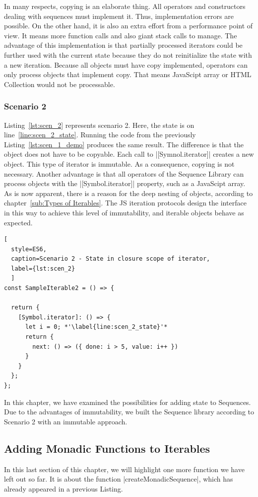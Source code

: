 In many respects, copying is an elaborate thing. All operators and constructors 
dealing with sequences must implement it. Thus, implementation errors are 
possible. On the other hand, it is also an extra effort from a performance point 
of view. It means more function calls and also giant stack calls to manage.
The advantage of this implementation is that partially processed iterators could 
be further used with the current state because they do not reinitialize the 
state with a new iteration.
Because all objects must have copy implemented, operators can 
only process objects that implement copy. That means JavaScipt array or HTML 
Collection would not be processable.

\subsubsection{Scenario 2}
Listing~\ref{lst:scen_2} represents scenario 2. Here, the state is on 
line~\ref{line:scen_2_state}. Running the code from the previously
Listing~\ref{lst:scen_1_demo} produces the same result. The difference is that 
the object does not have to be copyable. Each call to |[Symnol.iterator]| 
creates a new object. This type of iterator is immutable. As a consequence, 
copying is not necessary. Another advantage is that all operators of the 
Sequence Library can process objects with the |[Symbol.iterator]| property, 
such as a JavaScipt array.
\newline
As is now apparent, there is a reason for the deep nesting of objects, according 
to chapter~\ref{sub:Types of Iterables}. The JS iteration protocols design the 
interface in this way to achieve this level of immutability, and iterable 
objects behave as expected.

\begin{lstlisting}[
  style=ES6, 
  caption=Scenario 2 - State in closure scope of iterator,
  label={lst:scen_2}
  ]
const SampleIterable2 = () => {

  return {
    [Symbol.iterator]: () => {
      let i = 0; *'\label{line:scen_2_state}'*
      return {
        next: () => ({ done: i > 5, value: i++ })
      }
    }
  };
};
\end{lstlisting}

In this chapter, we have examined the possibilities for adding state to 
Sequences. Due to the advantages of immutability, we built the Sequence library 
according to Scenario 2 with an immutable approach.


\subsection{Adding Monadic Functions to Iterables}
\label{sub:Adding Monadic Functions to Iterables}
In this last section of this chapter, we will highlight one more function we 
have left out so far. It is about the function |createMonadicSequence|, which has
already appeared in a previous Listing.

